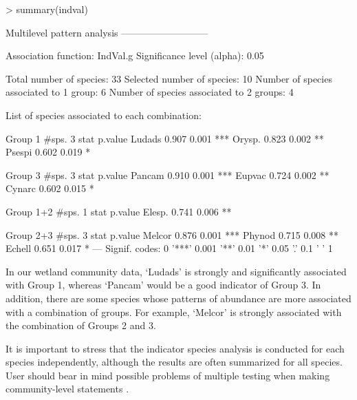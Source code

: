 \documentclass[11pt,a4paper]{article}
\begin{document}
\begin{Schunk}
\begin{Sinput}
> summary(indval) 
\end{Sinput}
\begin{Soutput}
 Multilevel pattern analysis
 ---------------------------

 Association function: IndVal.g
 Significance level (alpha): 0.05

 Total number of species: 33
 Selected number of species: 10 
 Number of species associated to 1 group: 6 
 Number of species associated to 2 groups: 4 

 List of species associated to each combination: 

 Group 1  #sps.  3 
        stat p.value    
Ludads 0.907   0.001 ***
Orysp. 0.823   0.002 ** 
Psespi 0.602   0.019 *  

 Group 3  #sps.  3 
        stat p.value    
Pancam 0.910   0.001 ***
Eupvac 0.724   0.002 ** 
Cynarc 0.602   0.015 *  

 Group 1+2  #sps.  1 
        stat p.value   
Elesp. 0.741   0.006 **

 Group 2+3  #sps.  3 
        stat p.value    
Melcor 0.876   0.001 ***
Phynod 0.715   0.008 ** 
Echell 0.651   0.017 *  
---
Signif. codes:  0 '***' 0.001 '**' 0.01 '*' 0.05 '.' 0.1 ' ' 1 
\end{Soutput}
\end{Schunk}
In our wetland community data, `Ludads' is strongly and significantly associated with Group 1, whereas `Pancam' would be a good indicator of Group 3. In addition, there are some species whose patterns of abundance are more associated with a combination of groups. For example, `Melcor' is strongly associated with the combination of Groups 2 and 3.

It is important to stress that the indicator species analysis is conducted for each species independently, although the results are often summarized for all species. User should bear in mind possible problems of multiple testing when making community-level statements \citep{DeCaceres2009}\citep{Legendre2012}.
\end{document}
